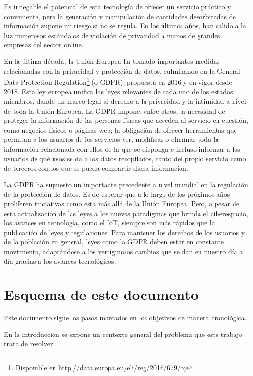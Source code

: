 \documentclass[12pt]{report} %
\begin{document}
	Es innegable el potencial de esta tecnología de ofrecer un servicio práctico y conveniente, pero la generación y manipulación de cantidades desorbitadas de información supone un riesgo si no se regula. En los últimos años, han salido a la luz numerosos escándalos de violación de privacidad a manos de grandes empresas del sector online.
	
	En la última década, la Unión Europea ha tomado importantes medidas relacionadas con la privacidad y protección de datos, culminando en la General Data Protection Regulation\footnote{Disponible en \url{http://data.europa.eu/eli/reg/2016/679/oj}} (o GDPR), propuesta en 2016 y en vigor desde 2018. Esta ley europea unifica las leyes relevantes de cada uno de los estados miembros, dando un marco legal al derecho a la privacidad y la intimidad a nivel de toda la Unión Europea. La GDPR impone, entre otros, la necesidad de proteger la información de las personas físicas que acceden al servicio en cuestión, como negocios físicos o páginas web; la obligación de ofrecer herramientas que permitan a los usuarios de los servicios ver, modificar o eliminar toda la información relacionada con ellos de la que se disponga e incluso informar a los usuarios de qué usos se da a los datos recopilados, tanto del propio servicio como de terceros con los que se pueda compartir dicha información.
	
	La GDPR ha supuesto un importante precedente a nivel mundial en la regulación de la protección de datos. Es de esperar que a lo largo de los próximos años proliferen iniciativas como esta más allá de la Unión Europea. Pero, a pesar de esta actualización de las leyes a los nuevos paradigmas que brinda el ciberespacio, los avances en tecnología, como el IoT, siempre son más rápidos que la publicación de leyes y regulaciones. Para mantener los derechos de los usuarios y de la población en general, leyes como la GDPR deben estar en constante movimiento, adaptándose a los vertiginosos cambios que se dan en nuestro día a día gracias a los avances tecnológicos.
	
	\section{Esquema de este documento}
	
	Este documento sigue los pasos marcados en los objetivos de manera cronológica.
	
	En la introducción se expone un contexto general del problema que este trabajo trata de resolver.
	
\end{document}

